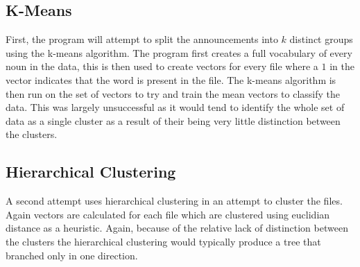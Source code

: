 \documentclass[draft]{article}
\begin{document}
\begin{multicols*}{2}
\subsection*{K-Means}
First, the program will attempt to split the announcements into \(k\) distinct groups using the k-means algorithm. The program first creates a full vocabulary of every noun in the data, this is then used to create vectors for every file where a \(1\) in the vector indicates that the word is present in the file. The k-means algorithm is then run on the set of vectors to try and train the mean vectors to classify the data. This was largely unsuccessful as it would tend to identify the whole set of data as a single cluster as a result of their being very little distinction between the clusters.

\subsection*{Hierarchical Clustering}
A second attempt uses hierarchical clustering in an attempt to cluster the files. Again vectors are calculated for each file which are clustered using euclidian distance as a heuristic. Again, because of the relative lack of distinction between the clusters the hierarchical clustering would typically produce a tree that branched only in one direction.




\end{multicols*}
\end{document}
